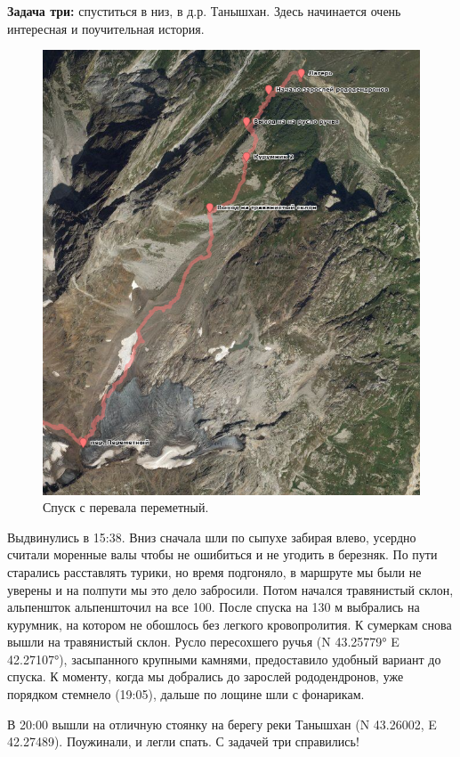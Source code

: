 \textbf{Задача три:} спуститься в низ, в д.р. Танышхан. Здесь начинается очень интересная и поучительная история.
\begin{figure}[h!]
	\centering
	\includegraphics[width=0.7\linewidth]{../pics/perem_down.png}
	\caption{Спуск с перевала переметный.}
	\label{perem_down}
\end{figure} 
Выдвинулись в 15:38. Вниз сначала шли по сыпухе забирая влево, усердно считали моренные валы чтобы не ошибиться и не угодить в березняк. По пути старались расставлять турики, но время подгоняло, в маршруте мы были не  уверены и на полпути мы это дело забросили.  Потом начался травянистый склон, альпеншток альпеншточил на все 100. После спуска на 130 м выбрались на курумник, на котором не обошлось без легкого кровопролития. К сумеркам снова вышли на травянистый склон. Русло пересохшего ручья (N 43.25779° E 42.27107°), засыпанного крупными камнями, предоставило удобный вариант до спуска. К моменту, когда мы добрались до зарослей рододендронов, уже порядком стемнело (19:05), дальше по лощине шли с фонарикам. 

В 20:00 вышли на отличную стоянку на берегу реки Танышхан (N 43.26002, E 42.27489). Поужинали, и легли спать. С задачей три справились!


\clearpage